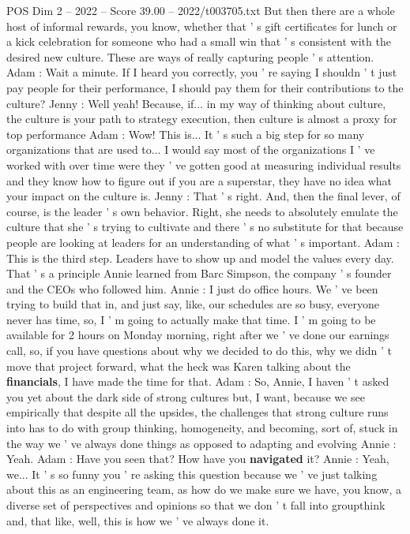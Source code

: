 \begin{textsample}{POS Dim 2 – 2022 – Score 39.00 – 2022/t003705.txt}
But then there are a whole host of informal rewards, you know, whether that ' s gift certificates for lunch or a kick celebration for someone who had a small win that ' s consistent with the desired new culture.
These are ways of really capturing people ' s attention.
Adam : Wait a minute.
If I heard you correctly, you ' re saying I shouldn ' t just pay people for their performance, I should pay them for their contributions to the culture?
Jenny : Well yeah!
Because, if... in my way of thinking about culture, the culture is your path to strategy execution, then culture is almost a proxy for top performance Adam : Wow!
This is...
It ' s such a big step for so many organizations that are used to...
I would say most of the organizations I ' ve worked with over time were they ' ve gotten good at measuring individual results and they know how to figure out if you are a superstar, they have no idea what your impact on the culture is.
Jenny : That ' s right.
And, then the final lever, of course, is the leader ' s own behavior.
Right, she needs to absolutely emulate the culture that she ' s trying to cultivate and there ' s no substitute for that because people are looking at leaders for an understanding of what ' s important.
Adam : This is the third step.
Leaders have to show up and model the values every day.
That ' s a principle Annie learned from Barc Simpson, the company ' s founder and the CEOs who followed him.
Annie : I just do office hours.
We ' ve been trying to build that in, and just say, like, our schedules are so busy, everyone never has time, so, I ' m going to actually make that time.
I ' m going to be available for 2 hours on Monday morning, right after we ' ve done our earnings call, so, if you have questions about why we decided to do this, why we didn ' t move that project forward, what the heck was Karen talking about the \textbf{financials}, I have made the time for that.
Adam : So, Annie, I haven ' t asked you yet about the dark side of strong cultures but, I want, because we see empirically that despite all the upsides, the challenges that strong culture runs into has to do with group thinking, homogeneity, and becoming, sort of, stuck in the way we ' ve always done things as opposed to adapting and evolving Annie : Yeah.
Adam : Have you seen that?
How have you \textbf{navigated} it?
Annie : Yeah, we...
It ' s so funny you ' re asking this question because we ' ve just talking about this as an engineering team, as how do we make sure we have, you know, a diverse set of perspectives and opinions so that we don ' t fall into groupthink and, that like, well, this is how we ' ve always done it.

\end{textsample}
